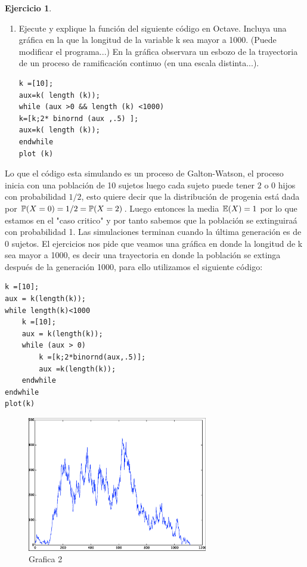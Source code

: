 \documentclass[a5paper,oneside]{amsart}
\theoremstyle{plain}
\theoremstyle{definition}
\newtheorem{ejercicio}{Ejercicio}
\begin{document}
\begin{ejercicio}
\begin{enumerate}
\item Ejecute y explique la funci\'on del siguiente c\'odigo en Octave. Incluya una gr\'afica en la que la longitud de la variable k sea mayor a 1000. (Puede modificar el programa...) En la gr\'afica observara un esbozo de la trayectoria de un proceso de ramificaci\'on continuo (en una escala distinta...).
\begin{lstlisting}
k =[10];
aux=k( length (k));
while (aux >0 && length (k) <1000)
k=[k;2* binornd (aux ,.5) ];
aux=k( length (k));
endwhile
plot (k)
\end{lstlisting}
\end{enumerate}
\end{ejercicio}
Lo que el c\'odigo esta simulando es un proceso de Galton-Watson, el proceso inicia con una  poblaci\'on de 10 sujetos luego cada sujeto puede tener $2$ o $0$  hijos con probabilidad $1/2$, esto quiere decir que la distribuci\'on de  progenia est\'a dada por $ \mathbb{P} (X=0)=1/2= \mathbb{P} (X=2)$. Luego entonces la media $\mathbb{E}\! \left( X \right)=1$ por lo que estamos en el "caso critico" y por tanto sabemos que la poblaci\'on se extinguira\'a con probabilidad 1.  Las simulaciones terminan cuando la \'ultima generaci\'on es de $0$ sujetos. El ejercicios nos pide que veamos una gr\'afica en donde la longitud de k sea mayor a 1000, es decir una trayectoria en donde la poblaci\'on se extinga despu\'es de la generaci\'on  1000, para ello utilizamos el siguiente c\'odigo:
\begin{lstlisting}
k =[10];
aux = k(length(k));
while length(k)<1000
    k =[10];
    aux = k(length(k));
    while (aux > 0)
        k =[k;2*binornd(aux,.5)];
        aux =k(length(k));
    endwhile
endwhile
plot(k)
\end{lstlisting}
\begin{figure}
  \centering
    \includegraphics[width=0.7\textwidth]{GaltonWatson.eps}
  \caption{Grafica 2}
  \label{fig:ejemplo}
\end{figure}
\end{document}
